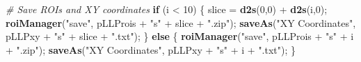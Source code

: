 \documentclass[11pt,singlespacinge,twoside]{reedthesis} %
\newenvironment{Shaded}{}{}
\newcommand{\CommentTok}[1]{\textit{#1}}
\newcommand{\ControlFlowTok}[1]{\textbf{#1}}
\newcommand{\DecValTok}[1]{#1}
\newcommand{\KeywordTok}[1]{\textbf{#1}}
\newcommand{\NormalTok}[1]{#1}
\newcommand{\OperatorTok}[1]{#1}
\newcommand{\StringTok}[1]{#1}
\theoremstyle{definition}
\theoremstyle{definition}
\theoremstyle{definition}
\theoremstyle{remark}
\begin{document}
\begin{Shaded}
\begin{Highlighting}[numbers=left,,]
    \CommentTok{#   Save ROIs and XY coordinates}
        \ControlFlowTok{if}\NormalTok{ (i }\OperatorTok{<}\StringTok{ }\DecValTok{10}\NormalTok{) \{}
\NormalTok{            slice =}\StringTok{ }\KeywordTok{d2s}\NormalTok{(}\DecValTok{0}\NormalTok{,}\DecValTok{0}\NormalTok{) }\OperatorTok{+}\StringTok{ }\KeywordTok{d2s}\NormalTok{(i,}\DecValTok{0}\NormalTok{);}
            \KeywordTok{roiManager}\NormalTok{(}\StringTok{"save"}\NormalTok{, pLLProis }\OperatorTok{+}\StringTok{ "s"} \OperatorTok{+}\StringTok{ }\NormalTok{slice }\OperatorTok{+}\StringTok{ ".zip"}\NormalTok{);}
            \KeywordTok{saveAs}\NormalTok{(}\StringTok{"XY Coordinates"}\NormalTok{, pLLPxy }\OperatorTok{+}\StringTok{ "s"} \OperatorTok{+}\StringTok{ }\NormalTok{slice }\OperatorTok{+}\StringTok{ ".txt"}\NormalTok{);}
\NormalTok{        \} }\ControlFlowTok{else}\NormalTok{ \{}
            \KeywordTok{roiManager}\NormalTok{(}\StringTok{"save"}\NormalTok{, pLLProis }\OperatorTok{+}\StringTok{ "s"} \OperatorTok{+}\StringTok{ }\NormalTok{i }\OperatorTok{+}\StringTok{ ".zip"}\NormalTok{);}
            \KeywordTok{saveAs}\NormalTok{(}\StringTok{"XY Coordinates"}\NormalTok{, pLLPxy }\OperatorTok{+}\StringTok{ "s"} \OperatorTok{+}\StringTok{ }\NormalTok{i }\OperatorTok{+}\StringTok{ ".txt"}\NormalTok{);}
\NormalTok{        \}}
            

\end{Highlighting}
\end{Shaded}
\end{document}
